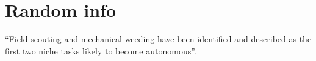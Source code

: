 \documentclass[preprint,authoryear,12pt]{elsarticle}
\begin{document}
\section{Random info}

``Field scouting and mechanical weeding have been identified and described as the first two niche tasks likely to become autonomous''\citep{Blackmore2004}.






\end{document}

